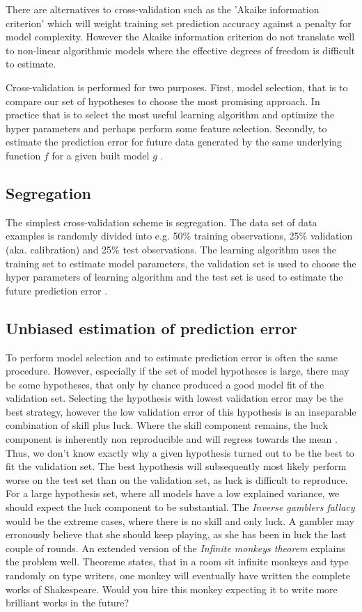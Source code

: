 There are alternatives to cross-validation such as the 'Akaike information criterion' which will weight training set prediction accuracy against a penalty for model complexity. However the Akaike information criterion do not translate well to non-linear algorithmic models where the effective degrees of freedom is difficult to estimate.

Cross-validation is performed for two purposes. First, model selection, that is to compare our set of hypotheses to choose the most promising approach. In practice that is to select the most useful learning algorithm and optimize the hyper parameters and perhaps perform some feature selection. Secondly, to estimate the prediction error for future data generated by the same underlying function $f$ for a given built model $g$ \cite{friedman2001elements}.

\subsection{Segregation}
The simplest cross-validation scheme is segregation. The data set of data examples is randomly divided into e.g. 50\% training observations, 25\% validation (aka. calibration) and 25\% test observations. The learning algorithm uses the training set to estimate model parameters, the validation set is used to choose the hyper parameters of learning algorithm and the test set is used to estimate the future prediction error \cite{friedman2001elements}.

\subsection{Unbiased estimation of prediction error}
\label{unbiased_estimation}
To perform model selection and to estimate prediction error is often the same procedure. However, especially if the set of model hypotheses is large, there may be some hypotheses, that only by chance produced a good model fit of the validation set. Selecting the hypothesis with lowest validation error may be the best strategy, however the low validation error of this hypothesis is an inseparable combination of skill plus luck. Where the skill component remains, the luck component is inherently non reproducible and will regress towards the mean \cite{kahneman2011thinking}. Thus, we don't know exactly why a given hypothesis turned out to be the best to fit the validation set. The best hypothesis will subsequently most likely perform worse on the test set than on the validation set, as luck is difficult to reproduce. For a large hypothesis set, where all models have a low explained variance, we should expect the luck component to be substantial. The \textit{Inverse gamblers fallacy} would be the extreme cases, where there is no skill and only luck. A gambler may erronously believe that she should keep playing, as she has been in luck the last couple of rounds. An extended version of the \textit{Infinite monkeys theorem} explains the problem well. Theoreme states, that in a room sit infinite monkeys and type randomly on type writers, one monkey will eventually  have written the complete works of Shakespeare. Would you hire this monkey expecting it to write more brilliant works in the future? \cite{wiki:gamblers,wiki:monkeys}

